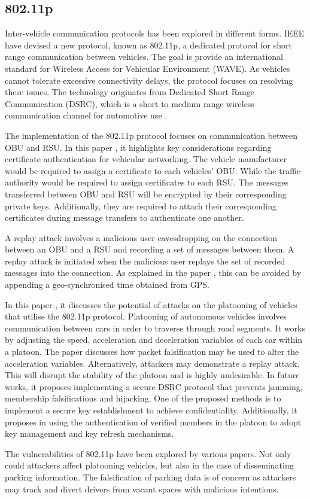 \subsection{802.11p}
Inter-vehicle communication protocols has been explored in different forms. IEEE have devised a new protocol, known as 802.11p, a dedicated protocol for short range communication between vehicles. The goal is provide an international standard for Wireless Access for Vehicular Environment (WAVE). As vehicles cannot tolerate excessive connectivity delays, the protocol focuses on resolving these issues. The technology originates from Dedicated Short Range Communication (DSRC), which is a short to medium range wireless communication channel for automotive use \cite{dsrc}.

The implementation of the 802.11p protocol focuses on communication between \ac{OBU} and \ac{RSU}. In this paper \citep{Panayappan2007VANET-basedAvailability}, it highlights key considerations regarding certificate authentication for vehicular networking. The vehicle manufacturer would be required to assign a certificate to each vehicles' \ac{OBU}. While the traffic authority would be required to assign certificates to each \ac{RSU}. The messages transferred between \ac{OBU} and \ac{RSU} will be encrypted by their corresponding private keys. Additionally, they are required to attach their corresponding certificates during message transfers to authenticate one another.

A replay attack involves a malicious user eavesdropping on the connection between an \ac{OBU} and a \ac{RSU} and recording a set of messages between them. A replay attack is initiated when the malicious user replays the set of recorded messages into the connection. As explained in the paper \citep{Panayappan2007VANET-basedAvailability}, this can be avoided by appending a geo-synchronised time obtained from GPS.

In this paper \cite{ucar_security_2016}, it discusses the potential of attacks on the platooning of vehicles that utilise the 802.11p protocol. Platooning of autonomous vehicles involves communication between cars in order to traverse through road segments. It works by adjusting the speed, acceleration and deceleration variables of each car within a platoon. The paper discusses how packet falsification may be used to alter the acceleration variables. Alternatively, attackers may demonstrate a replay attack. This will disrupt the stability of the platoon and is highly undesirable. In future works, it proposes implementing a secure DSRC protocol that prevents jamming, membership falsifications and hijacking. One of the proposed methods is to implement a secure key establishment to achieve confidentiality. Additionally, it proposes in using the authentication of verified members in the platoon to adopt key management and key refresh mechanisms.

The vulnerabilities of 802.11p have been explored by various papers. Not only could attackers affect platooning vehicles, but also in the case of disseminating parking information. The falsification of parking data is of concern as attackers may track and divert drivers from vacant spaces with malicious intentions.